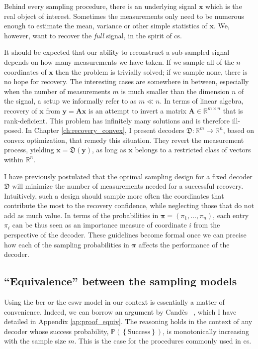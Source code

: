 Behind every sampling procedure, there is an underlying signal $\mathbf{x}$ which is the real object of interest. Sometimes the measurements only need to be numerous enough to estimate the mean, variance or other simple statistics of $\mathbf{x}$. We, however, want to recover the \emph{full} signal, in the spirit of \acrfull{cs}.

It should be expected that our ability to reconstruct a sub-sampled signal depends on how many measurements we have taken. If we sample all of the $n$ coordinates of $\mathbf{x}$ then the problem is trivially solved; if we sample none, there is no hope for recovery. The interesting cases are somewhere in between, especially when the number of measurements $m$ is much smaller than the dimension $n$ of the signal, a setup we informally refer to as $m \ll n$. In terms of linear algebra, recovery of $\mathbf{x}$ from $\mathbf{y} = \mathbf{Ax}$ is an attempt to invert a matrix $\mathbf{A} \in \mathbb{R}^{m \times n}$ that is rank-deficient. This problem has infinitely many solutions and is therefore ill-posed. In Chapter \ref{ch:recovery_convex}, I present decoders $\mathfrak{D} : \mathbb{R}^{m} \to \mathbb{R}^{n}$, based on convex optimization, that remedy this situation. They revert the measurement process, yielding $\mathbf{x} = \mathfrak{D}(\mathbf{y})$, as long as $\mathbf{x}$ belongs to a restricted class of vectors within $\mathbb{R}^{n}$.

I have previously postulated that the optimal sampling design for a fixed decoder $\mathfrak{D}$ will minimize the number of measurements needed for a successful recovery. Intuitively, such a design should sample more often the coordinates that contribute the most to the recovery confidence, while neglecting those that do not add as much value. In terms of the probabilities in $\bm{\pi} = (\pi_1, \dots, \pi_n)$, each entry $\pi_i$ can be thus seen as an importance measure of coordinate $i$ from the perspective of the decoder. These guidelines become formal once we can precise how each of the sampling probabilities in $\bm{\pi}$ affects the performance of the decoder.


\subsection{``Equivalence'' between the sampling models}\label{sec:samp_equiv}

Using the \acrshort{ber} or the \acrshort{cswr} model in our context is essentially a matter of convenience. Indeed, we can borrow an argument by Cand\`es \etal~\cite[Appendix]{candes2011a}, which I have detailed in Appendix \ref{ap:proof_equiv}. The reasoning holds in the context of any decoder whose success probability, $\mathbb{P} \left ( \left \{ \text{Success} \right \}\right )$, is monotonically increasing with the sample size $m$. This is the case for the procedures commonly used in \acrlong{cs}.

